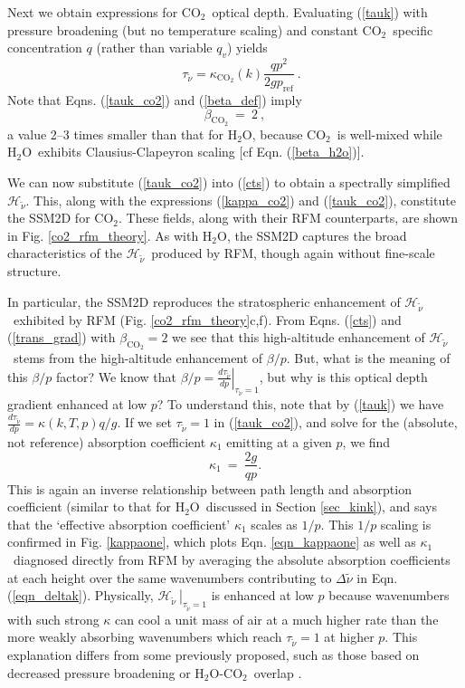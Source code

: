 \documentclass{ametsoc}
\newcommand{\beqn}{\begin{equation}}
\newcommand{\eeqn}{\end{equation}}
\newcommand{\n}{\nonumber}
\newcommand{\eqnref}[1]{(\ref{#1})}
\newcommand{\der}[2]{\ensuremath{\frac{d #1}{d #2}}}
\newcommand{\qv}{\ensuremath{q_v}}
\newcommand{\cotwo}{\ensuremath{\mathrm{CO_2}}}
\newcommand{\htwo}{\ensuremath{\mathrm{H_2O}}}
\newcommand{\wv}{\ensuremath{\widetilde{\nu}}}
\newcommand{\ch}{\ensuremath{\mathcal{H}}}
\newcommand{\chk}{\ensuremath{\ch_{\wv}}}
\newcommand{\tauk}{\ensuremath{\tau_{\wv}}}
\newcommand{\kappaone}{\ensuremath{\kappa_1}}
\newcommand{\pref}{\ensuremath{p_{\mathrm{ref}}}}
\begin{document}
Next we obtain expressions for \cotwo\ optical depth. Evaluating  \eqnref{tauk} with pressure broadening (but no temperature scaling) and constant \cotwo\ specific concentration $q$ (rather than variable \qv) yields
\beqn
	\quad \tauk  = \kappa_{\cotwo}(k)\frac{qp^2}{2g\pref}   \ .
	\label{tauk_co2}
\eeqn
 Note that Eqns. \eqnref{tauk_co2} and \eqnref{beta_def} imply 
 \beqn
 	\beta_{\cotwo} \ = \ 2 \ ,
	\n
\eeqn
a value 2--3 times smaller than that for \htwo, because \cotwo\ is well-mixed while \htwo\ exhibits Clausius-Clapeyron scaling [cf Eqn. \eqnref{beta_h2o}].

We can now substitute \eqnref{tauk_co2} into \eqnref{cts} to obtain a spectrally simplified \chk. This, along with the expressions \eqnref{kappa_co2}  and \eqnref{tauk_co2}, constitute the SSM2D for \cotwo. These fields, along with their RFM counterparts, are shown in Fig. \ref{co2_rfm_theory}. As with \htwo, the SSM2D captures the broad characteristics of the \chk\ produced by RFM, though again without fine-scale structure. 

In particular, the SSM2D reproduces the stratospheric enhancement of \chk\ exhibited by RFM (Fig. \ref{co2_rfm_theory}c,f). From Eqns. \eqnref{cts} and \eqnref{trans_grad} with $\beta_{\cotwo}=2$  we see that this high-altitude enhancement of \chk\  stems from the high-altitude enhancement of $\beta/p$.  But, what is the meaning of this $\beta/p$ factor? We know that $\beta/p = \left. \der{\tauk}{p}\right|_{\tauk=1}$, but why is this optical depth gradient enhanced at low $p$? To understand this, note that by \eqnref{tauk} we have $\der{\tauk}{p} = \kappa(k,T,p)q/g$. If we set  $\tauk=1$ in  \eqnref{tauk_co2}, and solve for the (absolute, not reference) absorption coefficient $\kappa_1$ emitting at a given $p$, we find 
\beqn
	\kappa_1 \ = \ \frac{2g}{qp}.
	\label{eqn_kappaone}
\eeqn
 This is again an inverse relationship between path length and absorption coefficient (similar to that for \htwo\  discussed in Section \ref{sec_kink}), and says that  the `effective absorption coefficient' $\kappa_1$  scales as $1/p$. 
 This $1/p$ scaling is confirmed in Fig. \ref{kappaone}, which plots Eqn. \eqref{eqn_kappaone} as well as \kappaone\ diagnosed directly from RFM by averaging the absolute absorption coefficients at each height over the same wavenumbers  contributing to $\Delta \wv$ in Eqn. \eqnref{eqn_deltak}. Physically, $\left.\chk\ \right|_{\tauk=1}$ is enhanced at low $p$  because wavenumbers with such strong $\kappa$ can cool a unit mass of air at a much higher rate than the more weakly absorbing wavenumbers which reach $\tauk=1$ at higher $p$.  This explanation differs from some previously proposed, such as those based on decreased pressure broadening \citep[][pg. 317]{petty2006} or \htwo-\cotwo\ overlap \citep[][]{zhu1992}.
\end{document}
